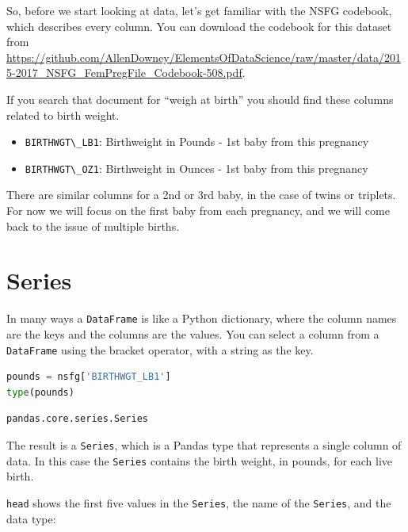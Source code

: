 So, before we start looking at data, let's get familiar with the NSFG
codebook, which describes every column. You can download the codebook
for this dataset from
\url{https://github.com/AllenDowney/ElementsOfDataScience/raw/master/data/2015-2017_NSFG_FemPregFile_Codebook-508.pdf}.

If you search that document for ``weigh at birth'' you should find these
columns related to birth weight.

\begin{itemize}
\item
  \passthrough{\lstinline!BIRTHWGT\_LB1!}: Birthweight in Pounds - 1st
  baby from this pregnancy
\item
  \passthrough{\lstinline!BIRTHWGT\_OZ1!}: Birthweight in Ounces - 1st
  baby from this pregnancy
\end{itemize}

There are similar columns for a 2nd or 3rd baby, in the case of twins or
triplets. For now we will focus on the first baby from each pregnancy,
and we will come back to the issue of multiple births.

\hypertarget{series}{%
\section{Series}\label{series}}

In many ways a \passthrough{\lstinline!DataFrame!} is like a Python
dictionary, where the column names are the keys and the columns are the
values. You can select a column from a
\passthrough{\lstinline!DataFrame!} using the bracket operator, with a
string as the key.

\begin{lstlisting}[language=Python,style=source]
pounds = nsfg['BIRTHWGT_LB1']
type(pounds)
\end{lstlisting}

\begin{lstlisting}[style=output]
pandas.core.series.Series
\end{lstlisting}

The result is a \passthrough{\lstinline!Series!}, which is a Pandas type
that represents a single column of data. In this case the
\passthrough{\lstinline!Series!} contains the birth weight, in pounds,
for each live birth.

\passthrough{\lstinline!head!} shows the first five values in the
\passthrough{\lstinline!Series!}, the name of the
\passthrough{\lstinline!Series!}, and the data type:

